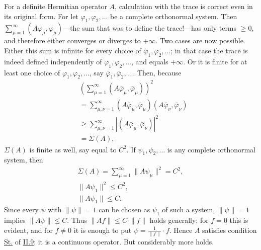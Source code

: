\documentclass[fontsize=13pt,twoside,openany,headings=normal,parskip=false,bookmarkpackage=false,DIV=calc]{scrbook}
\begin{document}
For a definite Hermitian operator $A$, calculation with the trace is correct even in its original form. For let $\varphi_1,\varphi_2,\ldots$ be a complete orthonormal system. Then
\hypertarget{origpage-98}{}%
$\sum_{\mu=1}^{\infty}(A\varphi_\mu,\varphi_\mu)$---the sum that was to define the trace!---has only terms $\geq0$, and therefore either converges or diverges to $+\infty$. Two cases are now possible. Either this sum is infinite for every choice of $\varphi_1,\varphi_2,\ldots$; in that case the trace is indeed defined independently of $\varphi_1,\varphi_2,\ldots$, and equals $+\infty$. Or it is finite for at least one choice of $\varphi_1,\varphi_2,\ldots$, say $\bar\varphi_1,\bar\varphi_2,\ldots$. Then, because
\begin{align*}
&\left(\sum_{\mu=1}^{\infty}(A\bar\varphi_\mu,\bar\varphi_\mu)\right)^2\\
&=\sum_{\mu,\nu=1}^{\infty}(A\bar\varphi_\mu,\bar\varphi_\mu)
(A\bar\varphi_\nu,\bar\varphi_\nu)\\
&\geq\sum_{\mu,\nu=1}^{\infty}|(A\bar\varphi_\mu,\bar\varphi_\nu)|^2\\
&=\Sigma(A),
\end{align*}
$\Sigma(A)$ is finite as well, say equal to $C^2$. If $\psi_1,\psi_2,\ldots$ is any complete orthonormal system, then
\begin{gather*}
\Sigma(A)=\sum_{\mu=1}^{\infty}\|A\psi_\mu\|^2=C^2,\\
\|A\psi_1\|^2\leq C^2,\\
\|A\psi_1\|\leq C.
\end{gather*}
Since every $\psi$ with $\|\psi\|=1$ can be chosen as $\psi_1$ of such a system, $\|\psi\|=1$ implies $\|A\psi\|\leq C$. Thus $\|Af\|\leq C\cdot\|f\|$ holds generally: for $f=0$ this is evident, and for $f\ne0$ it is enough to put $\psi=\frac1{\|f\|}\cdot f$. Hence $A$ satisfies condition \hyperref[eq:II.9.St]{St.} of \hyperref[sec:II.9]{II.9}; it is a continuous operator. But considerably more holds.
\end{document}
